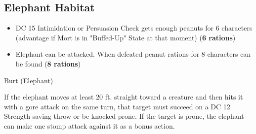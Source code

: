 \subsection*{ Elephant Habitat}
\begin{itemize}
	\item DC 15 Intimidation or Persuasion Check gets enough peanuts for 6 characters (advantage if Mort is in "Buffed-Up" State at that moment) (\textbf{6 rations})
	\item Elephant can be attacked. When defeated peanut rations for 8 characters can be found (\textbf{8 rations})
\end{itemize}
\begin{DndMonster}[width=0.5\textwidth]{Burt (Elephant)}

	\DndMonsterBasics[
		armor-class = {15 (Natural Armor)},
		hit-points  = {\DndDice{10d12 + 30}},
		speed       = {40 ft.},
	]

	\renewcommand{\AbilityScoreSpacer}{~}

	\DndMonsterAbilityScores[
		str = 22,
		dex = 9,
		con = 17,
		int = 3,
		wis = 11,
		cha = 6,
	]

	\DndMonsterDetails[
		senses = {passive Perception 10},
		languages = {Common},
		challenge = 5,
	]

	If the elephant moves at least 20 ft. straight toward a creature and then hits it with a gore attack on the same turn, that target must succeed on a DC 12 Strength saving throw or be knocked prone. If the target is prone, the elephant can make one stomp attack against it as a bonus action.
	

	\DndMonsterAttack[
		name=Gore,
		distance=melee, %
		mod=+8,
		reach=5,
		targets=one target,
		dmg={\DndDice{3d8 + 6}},
		dmg-type=piercing,
	]
	
	\DndMonsterAttack[
		name=Stomp,
		distance=melee, %
		mod=+8,
		reach=5,
		targets=one prone target,
		dmg={\DndDice{3d10 + 6}},
		dmg-type=bludgeoning,
	]
\end{DndMonster}

